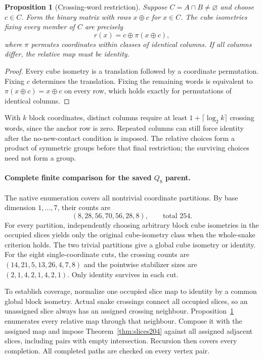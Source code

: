 \documentclass[11pt,a4paper]{article}
\newtheorem{proposition}[theorem]{Proposition}
\theoremstyle{definition}
\theoremstyle{remark}
\begin{document}
\begin{proposition}[Crossing-word restriction]
\label{prop:columns204}
Suppose $C=A\cap B\ne\varnothing$ and choose $c\in C$. Form the
binary matrix with rows $x\oplus c$ for $x\in C$. The cube isometries
fixing every member of $C$ are precisely
\[
r(x)=c\oplus\pi(x\oplus c),
\]
where $\pi$ permutes coordinates within classes of identical columns.
If all columns differ, the relative map must be identity.
\end{proposition}
\begin{proof}
Every cube isometry is a translation followed by a coordinate
permutation. Fixing $c$ determines the translation. Fixing the
remaining words is equivalent to $\pi(x\oplus c)=x\oplus c$ on
every row, which holds exactly for permutations of identical columns.
\end{proof}

With $k$ block coordinates, distinct columns require at least
$1+\lceil\log_2 k\rceil$ crossing words, since the anchor row is
zero. Repeated columns can still force identity after the
no-new-contact condition is imposed. The relative choices form a
product of symmetric groups before that final restriction; the
surviving choices need not form a group.

\paragraph{Complete finite comparison for the saved $Q_8$ parent.}
The native enumeration covers all nontrivial coordinate partitions.
By base dimension $1,\ldots,7$, their counts are
\[
(8,28,56,70,56,28,8),\qquad\text{total }254.
\]
For every partition, independently choosing arbitrary block cube
isometries in the occupied slices yields only the original
cube-isometry class when the whole-snake criterion holds. The two
trivial partitions give a global cube isometry or identity.
For the eight single-coordinate cuts, the crossing counts are
$(14,21,5,13,26,4,7,8)$ and the pointwise stabilizer sizes are
$(2,1,4,2,1,4,2,1)$. Only identity survives in each cut.

To establish coverage, normalize one occupied slice map to identity
by a common global block isometry. Actual snake crossings connect
all occupied slices, so an unassigned slice always has an assigned
crossing neighbour. Proposition~\ref{prop:columns204} enumerates
every relative map through that neighbour. Compose it with the
assigned map and impose Theorem~\ref{thm:slices204} against all
assigned adjacent slices, including pairs with empty intersection.
Recursion then covers every completion. All completed paths are
checked on every vertex pair.
\end{document}
